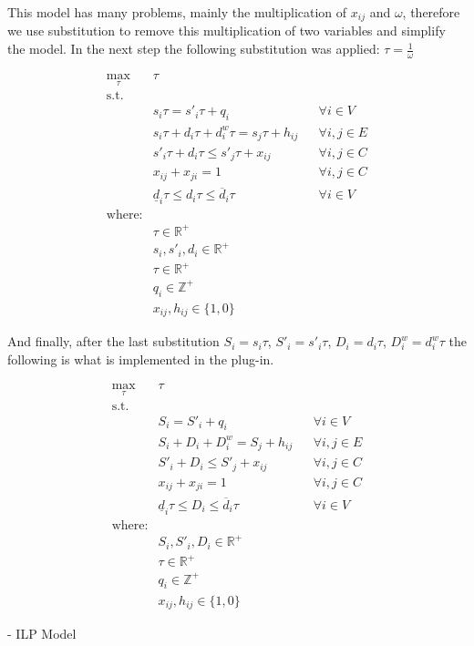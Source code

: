 This model has many problems, mainly the multiplication of $x_{ij}$ and  $\omega$, therefore we use substitution to remove this multiplication of two variables and simplify the model. In the next step the following substitution was applied: $\tau = \frac{1}{\omega}$

\begin{align}
\max_\tau\text{ } & \tau  \\
    \text{s.t. } \\
        & s_i \tau = s'_i \tau + q_i & & \forall i \in V \\
        & s_i \tau + d_i \tau + d^w_i \tau = s_j \tau + h_{ij} & & \forall i, j \in E \\
        & s'_i \tau + d_i \tau \leq s'_j \tau + x_{ij} & & \forall i, j \in C \\
        & x_{ij} + x_{ji} = 1 & & \forall i, j \in C \\
        & \underline{d}_i \tau \leq  d_i \tau \leq \overline{d}_i \tau & & \forall i \in V \\
    \text{where:} \\
        & \tau \in \mathbb{R}^+\\
        & s_i, s'_i, d_i \in \mathbb{R}^+\\
        & \tau \in \mathbb{R}^+ \\
        & q_i \in \mathbb{Z}^+\\
        & x_{ij}, h_{ij} \in \{1, 0\} 
\end{align}

And finally, after the last substitution $ S_i = s_i \tau $, $ S'_i = s'_i \tau $, $ D_i = d_i \tau $, $D^w_i = d^w_i \tau$ the following is what is implemented in the plug-in.

\begin{align}
    \displaystyle \max_\tau\text{ } & \tau  \\
    \textrm{s.t. } \\
        & S_i = S'_i + q_i & & \forall i \in V \\
        & S_i + D_i + D^w_i = S_j + h_{ij} & & \forall i, j \in E \\
        & S'_i + D_i \leq S'_j + x_{ij} & & \forall i, j \in C \\
        & x_{ij} + x_{ji} = 1 & & \forall i, j \in C \\
        & \underline{d}_i \tau \leq D_i \leq \overline{d}_i \tau & & \forall i \in V \\
    \text{where:} \\
        & S_i, S'_i, D_i \in \mathbb{R}^+\\
        & \tau \in \mathbb{R}^+ \\
        & q_i \in \mathbb{Z}^+\\
        & x_{ij}, h_{ij} \in \{1, 0\} 
\end{align}

- ILP Model